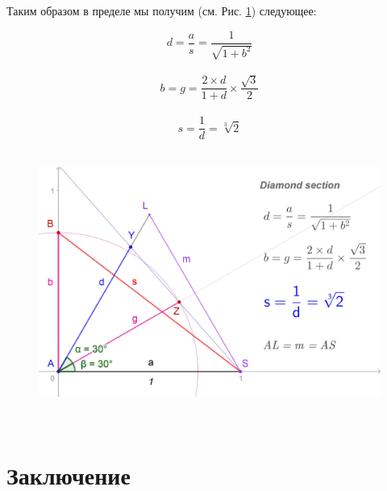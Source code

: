 \documentclass[12pt, letterpaper, oneside]{report}
\begin{document}
\begin{center}
	Таким образом в пределе мы получим (см. Рис. \ref{fig:definition}) следующее:
\end{center}
\begin{equation}
d=\frac{a}{s}=\frac{1}{\sqrt{1+b^{2}}}
\end{equation}
\\
\begin{equation}
 b=g=\frac{2\times d}{1+d}\times\frac{\sqrt{3}}{2}
\end{equation}
\\
\begin{equation}
s=\dfrac{1}{d}=\sqrt[3]{2}
\end{equation}
\\
\begin{figure}[h]
	\centering
	\includegraphics[width=0.7\linewidth]{images/ds_new_def.jpg}
	\caption{}
	\label{fig:definition}
\end{figure} \\

\begin{center}
\end{center}
\newpage
 
\section{Заключение}

 
\end{document}
